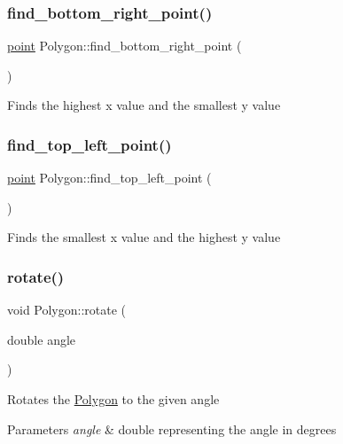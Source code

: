 \subsubsection{\texorpdfstring{find\+\_\+bottom\+\_\+right\+\_\+point()}{find\_bottom\_right\_point()}}
{\footnotesize\ttfamily \mbox{\hyperlink{structpoint}{point}} Polygon\+::find\+\_\+bottom\+\_\+right\+\_\+point (\begin{DoxyParamCaption}{ }\end{DoxyParamCaption})}

Finds the highest x value and the smallest y value \mbox{\label{class_polygon_a1c99b0b80833ef2eca19b98530d90910}} 
\subsubsection{\texorpdfstring{find\+\_\+top\+\_\+left\+\_\+point()}{find\_top\_left\_point()}}
{\footnotesize\ttfamily \mbox{\hyperlink{structpoint}{point}} Polygon\+::find\+\_\+top\+\_\+left\+\_\+point (\begin{DoxyParamCaption}{ }\end{DoxyParamCaption})}

Finds the smallest x value and the highest y value \mbox{\label{class_polygon_ae5993bb89530d873701d9d5558494c09}} 
\subsubsection{\texorpdfstring{rotate()}{rotate()}}
{\footnotesize\ttfamily void Polygon\+::rotate (\begin{DoxyParamCaption}\item[{double}]{angle }\end{DoxyParamCaption})}

Rotates the \mbox{\hyperlink{class_polygon}{Polygon}} to the given angle 
\begin{DoxyParams}{Parameters}
{\em angle} & double representing the angle in degrees \\
\hline
\end{DoxyParams}
\mbox{\label{class_polygon_aca723d97ae607e5079cd5dfd7ba616d3}} 

